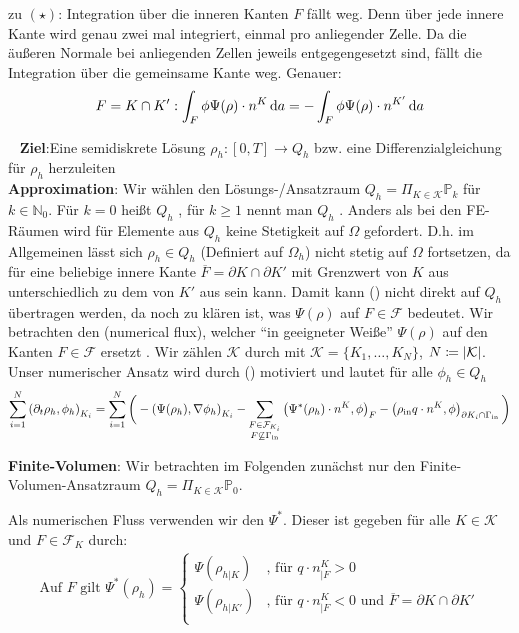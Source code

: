 \begin{remark}
	zu $ (\star) $: Integration über die inneren Kanten $ F $ fällt weg. Denn über jede innere Kante wird genau zwei mal integriert, einmal pro anliegender Zelle. Da die äußeren Normale bei anliegenden Zellen jeweils entgegengesetzt sind, fällt die Integration über die gemeinsame Kante weg. Genauer:
	\[ F = K \cap K': \int_{F}  \phi \Psi(\rho) \cdot n^K \mathop{}\!\mathrm{d} a = - \int_{F} \phi \Psi(\rho) \cdot n^{K'} \mathop{}\!\mathrm{d} a\]
\end{remark}
\ \newline
\textbf{Ziel}:Eine semidiskrete Lösung $ \rho_h: [0,T] \to Q_h $ bzw. eine Differenzialgleichung für $ \rho_h $ herzuleiten\\
\textbf{Approximation}:
Wir wählen den Lösungs-/Ansatzraum $ Q_h = \Pi_{K\in\mathcal{K}} \mathbb{P}_k $ für $ k \in \mathbb{N}_0 $. Für $ k = 0 $ heißt $ Q_h $ , für $ k \geq 1 $ nennt man $ Q_h $ . Anders als bei den FE-Räumen wird für Elemente aus $ Q_h $ keine Stetigkeit auf $ \Omega $ gefordert. D.h. im Allgemeinen lässt sich $ \rho_h \in Q_h $ (Definiert auf $ \Omega_h $) nicht stetig auf $ \Omega $ fortsetzen, da für eine beliebige innere Kante $ \overline{F} = \partial K \cap \partial K' $ mit Grenzwert von $ K $ aus unterschiedlich zu dem von $ K' $ aus sein kann. Damit kann (\sun) nicht direkt auf $ Q_h $ übertragen werden, da noch zu klären ist, was $ \Psi(\rho) $ auf $ F \in \mathcal{F} $ bedeutet. Wir betrachten den  (numerical flux), welcher \enquote{in geeigneter Weiße} $ \Psi(\rho) $ auf den Kanten $ F \in \mathcal{F} $ ersetzt . Wir zählen $ \mathcal{K} $ durch mit $ \mathcal{K} = \{K_1 , \dots , K_N\} $, $ N \coloneqq \abs{\mathcal{K}} $.
Unser numerischer Ansatz wird durch (\sun) motiviert und lautet für alle $ \phi_h \in Q_h $
\[
\sum_{i = 1}^{N} \left(\partial_t \rho_h, \phi_h  \right)_{K_i}  = \sum_{i=1}^{N} \bigg(- \left(\Psi(\rho_h), \nabla\phi_h \right)_{K_i} -\sum_{\substack{F \in \mathcal{F}_{K_i} \\ F \not\subseteq \Gamma_{{\text{in}}}}} \left(\Psi^*(\rho_h) \cdot n^K, \phi \right)_{F} - \left(\rho_{\text{in}} q \cdot n^K, \phi \right)_{\partial K_i \cap \Gamma_{{\text{in}}}} \bigg)
\]



\textbf{Finite-Volumen}:
Wir betrachten im Folgenden zunächst nur den Finite-Volumen-Ansatzraum $ Q_h = \Pi_{K \in \mathcal{K}} \mathbb{P}_0 $. 

Als numerischen Fluss verwenden wir den  $ \Psi^* $. Dieser ist gegeben für alle $ K \in \mathcal{K} $ und $ F \in \mathcal{F}_K $ durch:
\begin{gather*}
	\text{Auf } F \text{ gilt }\Psi^*(\rho_h) = \begin{cases}
	\Psi(\rho_{h|K}) &\text{, für } q \cdot n^K_{|F} > 0\\
	\Psi(\rho_{h|K'}) &\text{, für } q\cdot n^K_{|F} < 0 \text{ und } \overline{F} = \partial K \cap \partial K'\\
	\end{cases}  
\end{gather*}


